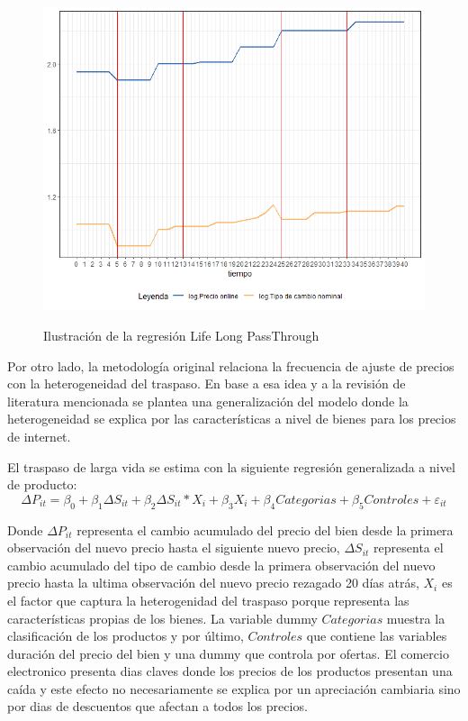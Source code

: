 \documentclass[12pt,a4paper,pdflatex]{article}
\begin{document}
\begin{figure}[!ht]
\centering
 \caption{Ilustración de la regresión Life Long PassThrough}
\includegraphics[scale=0.7]{metodologia.png}
  \label{fig:TIlustración de la regresión Life Long PassThrough}
\end{figure}

Por otro lado, la metodología original relaciona la frecuencia de ajuste de precios con la heterogeneidad del traspaso. En base a esa idea y a la revisión de literatura mencionada se plantea una generalización del modelo donde la heterogeneidad se explica por las características a nivel de bienes para los precios de internet.


El traspaso de larga vida se estima con la siguiente regresión generalizada a nivel de producto:
\begin{equation}
\Delta P_{it} = \beta_{0} +\beta_{1} \Delta S_{it}  + \beta_{2} \Delta S_{it}*X_{i} + \beta_{3}X_{i} + \beta_{4}Categorias + \beta_{5}Controles + \varepsilon_{it}
\end{equation}

Donde $\Delta P_{it}$ representa el cambio acumulado del precio del bien desde la primera observaci\'on del nuevo precio hasta el siguiente nuevo precio, $\Delta S_{it}$ representa el cambio acumulado del tipo de cambio desde la primera observaci\'on del nuevo precio hasta la ultima observaci\'on del nuevo precio rezagado 20 d\'ias atr\'as, $X_{i}$ es el factor que captura la heterogenidad del traspaso porque representa las características propias de los bienes. La variable dummy $Categorias$ muestra la clasificaci\'on de los productos y por último,	$Controles$ que contiene las variables duración del precio del bien y una dummy que controla por ofertas.
El comercio electronico presenta dias claves donde los precios de los productos presentan una caída y este efecto no necesariamente se explica por un apreciación cambiaria sino por dias de descuentos que afectan a todos los precios.
\end{document}
